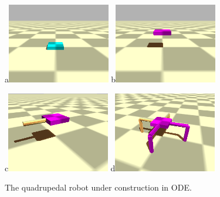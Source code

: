 \documentclass[12pt]{article}
\begin{document}
\begin{figure}[!t]
\centerline{
a\includegraphics[width=0.4\textwidth]{fig2a}
b\includegraphics[width=0.4\textwidth]{fig2b}
}
\centerline{
c\includegraphics[width=0.4\textwidth]{fig2c}
d\includegraphics[width=0.4\textwidth]{fig2d}
}
\caption{The quadrupedal robot under construction in ODE.}
\label{Fig2}
\end{figure}
\end{document}
